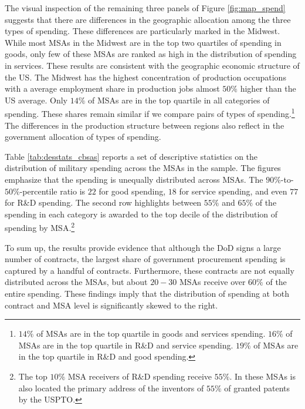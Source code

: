 \documentclass[dv_diss_main.tex]{subfiles}
\begin{document}
The visual inspection of the remaining three panels of Figure \ref{fig:map_spend} suggests that there are differences in the geographic allocation among the three types of spending. These differences are particularly marked in the Midwest. While most MSAs in the Midwest are in the top two quartiles of spending in goods, only few of these MSAs are ranked as high in the distribution of spending in services. These results are consistent with the geographic economic structure of the US. The Midwest has the highest concentration of production occupations with a average employment share in production jobs almost $50\%$ higher than the US average. Only $14\%$ of MSAs are in the top quartile in all categories of spending. These shares remain similar if we compare pairs of types of spending.\footnote{$14\%$ of MSAs are in the top quartile in goods and services spending. $16\%$ of MSAs are in the top quartile in R\&D and service spending. $19\%$ of MSAs are in the top quartile in R\&D and good spending.} The differences in the production structure between regions also reflect in the government allocation of types of spending.

Table \ref{tab:desstats_cbsas} reports a set of descriptive statistics on the distribution of military spending across the MSAs in the sample. The figures emphasize that the spending is unequally distributed across MSAs. The $90\%$-to-$50\%$-percentile ratio is $22$ for good spending, $18$ for service spending, and even $77$ for R\&D spending. The second row highlights between $55\%$ and $65\%$ of the spending in each category is awarded to the top decile of the distribution of spending by MSA.\footnote{The top $10\%$ MSA receivers of R\&D spending receive $55\%$. In these MSAs is also located the primary address of the inventors of $55\%$ of granted patents by the USPTO.}


To sum up, the results provide evidence that although the DoD signs a large number of contracts, the largest share of government procurement spending is captured by a handful of contracts. Furthermore, these contracts are not equally distributed across the MSAs, but about $20-30$ MSAs receive over $60\%$ of the entire spending. These findings imply that the distribution of spending at both contract and MSA level is significantly skewed to the right. 
\end{document}
